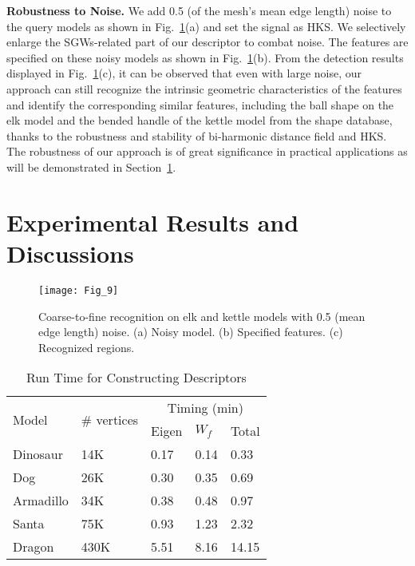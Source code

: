 \textbf{Robustness to Noise.} We add 0.5 (of the mesh's mean edge
length) noise to the query models as shown in Fig.~\ref{noise}(a) and
set the signal as HKS. We selectively enlarge the SGWs-related part
of our descriptor to combat noise. The features are specified on these
noisy models as shown in Fig.~\ref{noise}(b). From the detection
results displayed in Fig.~\ref{noise}(c), it can be observed that even
with large noise, our approach can still recognize the intrinsic
geometric characteristics of the features and identify the
corresponding similar features, including the ball shape on the elk
model and the bended handle of the kettle model from the shape
database, thanks to the robustness and stability of bi-harmonic
distance field and HKS. The robustness of our approach is of great
significance in practical applications as will be demonstrated in
Section~\ref{sec:Exp}.

\section{Experimental Results and Discussions}
\label{sec:Exp}

\begin{figure}[!to]
\texttt{[image: Fig\_9]}
\caption[Coarse-to-fine recognition on elk and kettle models.]
  {Coarse-to-fine recognition on elk and kettle models with 0.5
  (mean edge length) noise. (a) Noisy model. (b) Specified features.
  (c) Recognized regions.}
\label{noise}
\end{figure}

\begin{table}
\centering
\caption{Run Time for Constructing Descriptors}
  \label{table:time}
  \renewcommand{\arraystretch}{1.3}
\begin{tabular}{p{}p{}p{}p{}p{}}
\hline
\multirow{2}{*}{Model} &
\multirow{2}{*}{\# vertices} &
\multicolumn{3}{c}{Timing (min)} \\
\cline{3-5}
&\multicolumn{1}{c}{} & Eigen &  $W_f$ & Total\\
\hline
Dinosaur   & 14K & 0.17 & 0.14 & 0.33 \\
Dog       & 26K & 0.30 & 0.35 & 0.69 \\
Armadillo & 34K & 0.38 & 0.48 & 0.97 \\
Santa     & 75K & 0.93 & 1.23 & 2.32\\
Dragon & 430K & 5.51 & 8.16 & 14.15\\
\hline
\end{tabular}
\end{table}

